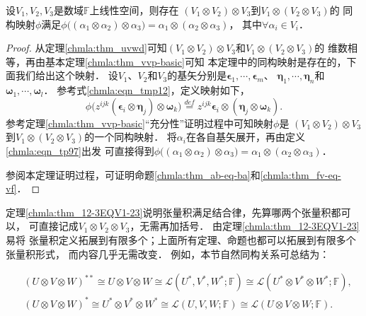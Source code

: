 \begin{theorem}\label{chmla:thm_12-3EQV1-23}
    设$V_1, V_2, V_3$是数域$\mathbb{F}$上线性空间，则存在
    $(V_1 \otimes V_2) \otimes V_3$到$V_1 \otimes (V_2 \otimes V_3)$的
    同构映射$\phi$满足$\phi\bigl((\alpha_1 \otimes \alpha_2) \otimes \alpha_3\bigr)
    = \alpha_1 \otimes (\alpha_2 \otimes \alpha_3)$，
    其中$\forall \alpha_i \in V_i$．
\end{theorem}
\begin{proof}
    从定理\ref{chmla:thm_uvwd}可知$(V_1 \otimes V_2) \otimes V_3$和$V_1 \otimes (V_2 \otimes V_3)$的
    维数相等，再由基本定理\ref{chmla:thm_vvp-basic}可知
    本定理中的同构映射是存在的，下面我们给出这个映射．
    设$V_1$、$V_2$和$V_3$的基矢分别是$\boldsymbol{\epsilon}_1, \cdots, \boldsymbol{\epsilon}_m$、
    $\boldsymbol{\eta}_1, \cdots, \boldsymbol{\eta}_n$和$\boldsymbol{\omega}_1, \cdots, \boldsymbol{\omega}_l$．
    参考式\eqref{chmla:eqn_tmp12}，定义映射如下，
    \begin{equation}\label{chmla:eqn_tp97}
        \phi\bigl(z^{ijk} (\boldsymbol{\epsilon}_i\otimes\boldsymbol{\eta}_j)\otimes \boldsymbol{\omega}_k \bigr)
        \overset{def}{=}
        z^{ijk} \boldsymbol{\epsilon}_i\otimes (\boldsymbol{\eta}_j\otimes \boldsymbol{\omega}_k ) .
    \end{equation}
    参考定理\ref{chmla:thm_vvp-basic}“充分性”证明过程中可知映射$\phi$是
    $(V_1 \otimes V_2) \otimes V_3$到$V_1 \otimes (V_2 \otimes V_3)$的一个同构映射．
    将$\alpha_i$在各自基矢展开，再由定义\eqref{chmla:eqn_tp97}出发
    可直接得到$\phi\bigl((\alpha_1 \otimes \alpha_2) \otimes \alpha_3\bigr)
    = \alpha_1 \otimes (\alpha_2 \otimes \alpha_3)$．

    参阅本定理证明过程，可证明命题\ref{chmla:thm_ab-eq-ba}和\ref{chmla:thm_fv-eq-vf}．
\end{proof}
定理\ref{chmla:thm_12-3EQV1-23}说明张量积满足结合律，先算哪两个张量积都可以，
可直接记成$V_1 \otimes V_2 \otimes V_3$，无需再加括号．
由定理\ref{chmla:thm_12-3EQV1-23}易将
张量积定义拓展到有限多个；上面所有定理、命题也都可以拓展到有限多个张量积形式，
而内容几乎无需改变．
例如，本节自然同构关系可总结为： 
\begin{small}
\begin{equation} \label{chmla:lpcong}
    \begin{aligned}
        &(U\otimes V\otimes W)^{**}  \cong  U\otimes V\otimes W \cong
          \mathscr{L}(U^*,V^*, W^*;\mathbb{F})    \cong
          \mathscr{L}(U^*\! \otimes\! V^*\! \otimes \! W^*;\! \mathbb{F}),  \\
        &(U\otimes V\otimes W)^*  \cong  U^*\otimes V^* \otimes W^*\cong
          \mathscr{L}(U,V,W;\mathbb{F}) \cong
          \mathscr{L}(U\otimes V\otimes W;\mathbb{F}) . 
    \end{aligned}
\end{equation} 
\end{small}


